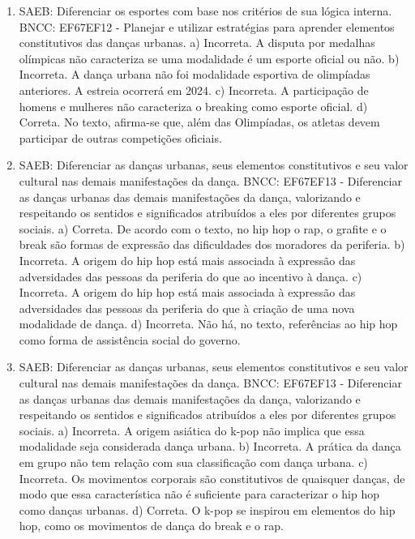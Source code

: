 \begin{enumerate}
\item
SAEB: Diferenciar os esportes com base nos critérios de sua lógica
interna.
BNCC: EF67EF12 - Planejar e utilizar estratégias para aprender elementos
constitutivos das danças urbanas.
a) Incorreta. A disputa por medalhas olímpicas não caracteriza se uma
modalidade é um esporte oficial ou não.
b) Incorreta. A dança urbana não foi modalidade esportiva de olimpíadas 
anteriores. A estreia ocorrerá em 2024.
c) Incorreta. A participação de homens e mulheres não caracteriza o
breaking como esporte oficial.
d) Correta. No texto, afirma-se que, além das Olimpíadas, os atletas
devem participar de outras competições oficiais.

\item
SAEB: Diferenciar as danças urbanas, seus elementos constitutivos
e seu valor cultural nas demais manifestações da dança.
BNCC: EF67EF13 - Diferenciar as danças urbanas das demais manifestações
da dança, valorizando e respeitando os sentidos e significados
atribuídos a eles por diferentes grupos sociais.
a) Correta. De acordo com o texto, no hip hop o rap, o grafite e
o break são formas de expressão das dificuldades dos moradores da 
periferia.
b) Incorreta. A origem do hip hop está mais associada à expressão das 
adversidades das pessoas da periferia do que ao incentivo à dança.
c) Incorreta. A origem do hip hop está mais associada à expressão das 
adversidades das pessoas da periferia do que à criação de uma nova
modalidade de dança.
d) Incorreta. Não há, no texto, referências ao hip hop como forma de 
assistência social do governo.

\item
SAEB: Diferenciar as danças urbanas, seus elementos constitutivos
e seu valor cultural nas demais manifestações da dança.
BNCC: EF67EF13 - Diferenciar as danças urbanas das demais manifestações
da dança, valorizando e respeitando os sentidos e significados
atribuídos a eles por diferentes grupos sociais.
a) Incorreta. A origem asiática do k-pop não implica que essa modalidade
seja considerada dança urbana.
b) Incorreta. A prática da dança em grupo não tem relação com sua
classificação com dança urbana.
c) Incorreta. Os movimentos corporais são constitutivos de quaisquer 
danças, de modo que essa característica não é suficiente para caracterizar 
o hip hop como danças urbanas.
d) Correta. O k-pop se inspirou em elementos do hip hop, como os
movimentos de dança do break e o rap.
\end{enumerate}

